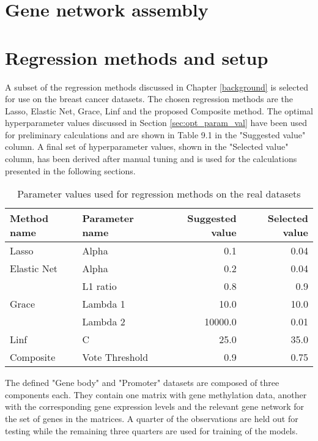 \section{Gene network assembly} \label{sec_netwk}

\pagebreak
\section{Regression methods and setup}
A subset of the regression methods discussed in Chapter \ref{background} is selected for use on the breast cancer datasets. The chosen regression methods are the Lasso, Elastic Net, Grace, Linf and the proposed Composite method.
The optimal hyperparameter values discussed in Section \ref{sec:opt_param_val} have been used for preliminary calculations and are shown in Table 
9.1 %
in the "Suggested value" column. A final set of hyperparameter values, shown in the "Selected value" column, has been derived after manual tuning and is used for the calculations presented in the following sections.

{\def\arraystretch{1.5}\tabcolsep=10pt
	\begin{table}[H]
		\label{tab:plswork}
		\caption{Parameter values used for regression methods on the real datasets}
		\centering
		\begin{tabular}{l l r r}
			\hline\hline 
			Method name & Parameter name & Suggested value & Selected value\\
			\hline\hline
			Lasso	&	Alpha	&	0.1	&	0.04\\
			\hline
			Elastic Net	&	Alpha	&	0.2	&	0.04\\
						&	L1 ratio&	0.8	&	0.9\\
			\hline
			Grace	&	Lambda 1	&	10.0	&	10.0\\
					&	Lambda 2	&	10000.0	&	0.01\\
			\hline
			Linf	&	C	&	25.0	&	35.0\\
			\hline
			Composite	&	Vote Threshold	&	0.9	&	0.75\\
			\hline
		\end{tabular}
	\end{table}
}

The defined "Gene body" and "Promoter" datasets are composed of three components each. They contain one matrix with gene methylation data, another with the corresponding gene expression levels and the relevant gene network for the set of genes in the matrices. A quarter of the observations are held out for testing while the remaining three quarters are used for training of the models.

